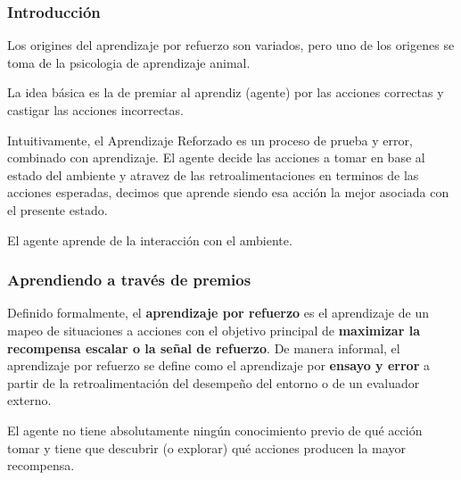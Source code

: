 \documentclass[
	11pt, %
]{beamer}
\begin{document}

\begin{frame}
  \frametitle{Introducción}

  Los origines del aprendizaje por refuerzo son variados, pero uno de los origenes se toma de la psicologia de aprendizaje animal.\\

  \bigskip %
  
  La idea básica es la de premiar al aprendiz (agente) por las acciones correctas y castigar las acciones incorrectas.

  \bigskip %

  Intuitivamente, el \alert{Aprendizaje Reforzado} es un proceso de prueba y error, combinado con aprendizaje. El agente decide las acciones a tomar en base al estado del ambiente y atravez de las retroalimentaciones en terminos de las acciones esperadas, decimos que aprende siendo esa acción la mejor asociada con el presente estado.

  \bigskip %

  El agente aprende de la interacción con el ambiente.
    
\end{frame}

\begin{frame}
  \frametitle{Aprendiendo a través de premios}

  Definido formalmente, el \textbf{aprendizaje por refuerzo} es el aprendizaje de un mapeo de situaciones a acciones con el objetivo principal de \textbf{maximizar la recompensa escalar o la señal de refuerzo}. De manera informal, el aprendizaje por refuerzo se define como el aprendizaje por \textbf{ensayo y error} a partir de la retroalimentación del desempeño del entorno o de un evaluador externo.

  \bigskip %
  
  El agente no tiene absolutamente ningún conocimiento previo de qué acción tomar y tiene que descubrir (o explorar) qué acciones producen la mayor recompensa.
    
\end{frame}
\end{document}
